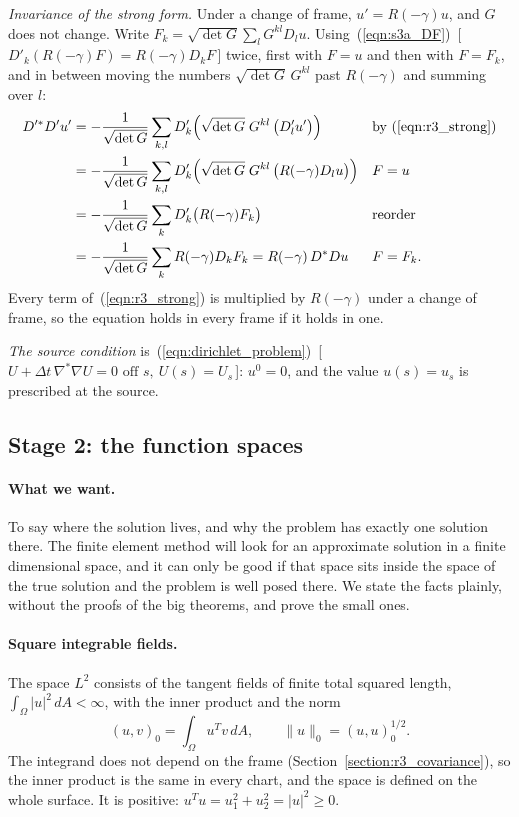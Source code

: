 \emph{Invariance of the strong form.} Under a change of frame, $u' = R(-\gamma)u$, and $G$ does not change. Write $F_k = \sqrt{\det G}\sum_l G^{kl}D_lu$. Using~(\ref{eqn:s3a_DF})~[\,$D'_k(R(-\gamma)F) = R(-\gamma)D_kF$\,] twice, first with $F = u$ and then with $F = F_k$, and in between moving the numbers $\sqrt{\det G}\,G^{kl}$ past $R(-\gamma)$ and summing over $l$:
\begin{align*}
D'^*D'u' &= -\frac{1}{\sqrt{\det G}} \sum_{k,l} D'_k\Big(\sqrt{\det G}\; G^{kl}\, \big(D'_lu'\big)\Big) && \text{by (\ref{eqn:r3_strong})} \\
&= -\frac{1}{\sqrt{\det G}} \sum_{k,l} D'_k\Big(\sqrt{\det G}\; G^{kl}\, \big(R(-\gamma)D_lu\big)\Big) && F = u \\
&= -\frac{1}{\sqrt{\det G}} \sum_{k} D'_k\big(R(-\gamma)F_k\big) && \text{reorder} \\
&= -\frac{1}{\sqrt{\det G}} \sum_{k} R(-\gamma) D_kF_k = R(-\gamma)\, D^*Du && F = F_k .
\end{align*}
Every term of~(\ref{eqn:r3_strong}) is multiplied by $R(-\gamma)$ under a change of frame, so the equation holds in every frame if it holds in one.

\emph{The source condition} is~(\ref{eqn:dirichlet_problem})~[\,$U + \Delta t\,\nabla^*\nabla U = 0 \text{ off } s,\ U(s) = U_s$\,]: $u^0 = 0$, and the value $u(s) = u_s$ is prescribed at the source.

\subsection{Stage 2: the function spaces}
\label{section:r3_stage2}

\paragraph{What we want.} To say where the solution lives, and why the problem has exactly one solution there. The finite element method will look for an approximate solution in a finite dimensional space, and it can only be good if that space sits inside the space of the true solution and the problem is well posed there. We state the facts plainly, without the proofs of the big theorems, and prove the small ones.

\paragraph{Square integrable fields.} The space $L^2$ consists of the tangent fields of finite total squared length, $\int_\Omega |u|^2\, dA < \infty$, with the inner product and the norm
\begin{equation*}
(u, v)_0 = \int_\Omega u^Tv\, dA, \qquad \|u\|_0 = (u, u)_0^{1/2} .
\end{equation*}
The integrand does not depend on the frame (Section~\ref{section:r3_covariance}), so the inner product is the same in every chart, and the space is defined on the whole surface. It is positive: $u^Tu = u_1^2 + u_2^2 = |u|^2 \ge 0$.

